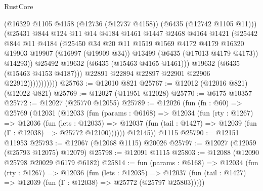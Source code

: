 \begin{lexlean}{RustCore}
\begin{coremodule}
                            (@16329 @1105 @4158 (@12736 (@12737 @4158)) (@6435 (@12742 @1105 @11)))
                            (@25431
                              @844
                              @124
                              @11
                              @14
                              @4184
                              @1461
                              @1447
                              @2468
                              @4164
                              @1421
                              (@25442
                                @844
                                @11
                                @4184
                                (@25450
                                  @34
                                  @20
                                  @11
                                  @1519
                                  @1569
                                  @4172
                                  @4179
                                  @16320
                                  @19903
                                  @19907
                                  (@16997 (@19909 @34))
                                  @13499
                                  (@6435 (@17013 @4179 @4173))
                                  @14293))
                              @25492
                              @19632
                              (@6435 (@15463 @4165 @1461)))
                            @19632
                            (@6435 (@15463 @4153 @4187)))
                          @22891
                          @22894
                          @22897
                          @22901
                          @22906
                          @22912)))))))))))
@25763 := @12010 @821
@25767 := @12012 (@12016 @821) (@12022 @821)
@25769 := @12027 (@11951 @12028)
@25770 := @6175 @10357
@25772 := @12027 (@25770 @12055)
@25789 := @12026
    (fun (fn : @60) =>
    @25769
      (@12031
        (@12033
          (fun (params : @6168) =>
          @12034
            (fun (rty : @1267) =>
            @12036
              (fun (lets : @12035) =>
              @12037 (fun (tail : @1427) => @12039 (fun (Γ : @12038) => @25772 @12100))))))
        @12145))
    @1115
@25790 := @12151 @11953
@25793 := @12067 (@12068 @1115) @20026
@25797 := @12027 (@12059 (@25793 @12075) @12079)
@25798 := @12091 @1115
@25803 := @12088 (@12090 @25798 @20029 @6179 @6182)
@25814 := fun (params : @6168) =>
  @12034
    (fun (rty : @1267) =>
    @12036
      (fun (lets : @12035) =>
      @12037 (fun (tail : @1427) => @12039 (fun (Γ : @12038) => @25772 (@25797 @25803)))))

\end{coremodule}
\end{lexlean}
